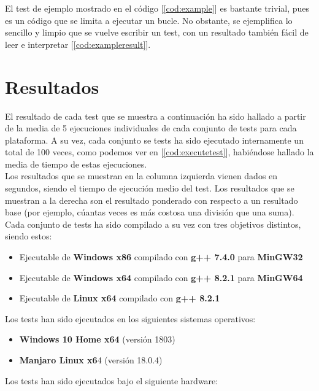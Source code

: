 El test de ejemplo mostrado en el código [\ref{cod:example}] es bastante trivial, pues es un código que se limita a ejecutar un bucle. No obstante, se ejemplifica lo sencillo y limpio que se vuelve escribir un test, con un resultado también fácil de leer e interpretar [\ref{cod:exampleresult}].

\section{Resultados}

El resultado de cada test que se muestra a continuación ha sido hallado a partir de la media de 5 ejecuciones individuales de cada conjunto de tests para cada plataforma. A su vez, cada conjunto se tests ha sido ejecutado internamente un total de 100 veces, como podemos ver en [\ref{cod:executetest}], habiéndose hallado la media de tiempo de estas ejecuciones.\\

Los resultados que se muestran en la columna izquierda vienen dados en segundos, siendo el tiempo de ejecución medio del test. Los resultados que se muestran a la derecha son el resultado ponderado con respecto a un resultado base (por ejemplo, cúantas veces es más costosa una división que una suma).\\

Cada conjunto de tests ha sido compilado a su vez con tres objetivos distintos, siendo estos:

\begin{itemize}
	\item Ejecutable de \textbf{Windows x86} compilado con \textbf{g++ 7.4.0} para \textbf{MinGW32}
	\item Ejecutable de \textbf{Windows x64} compilado con \textbf{g++ 8.2.1} para \textbf{MinGW64}
	\item Ejecutable de \textbf{Linux x64} compilado con \textbf{g++ 8.2.1}
\end{itemize}

Los tests han sido ejecutados en los siguientes sistemas operativos:

\begin{itemize}
	\item \textbf{Windows 10 Home x64} (versión 1803)
	\item \textbf{Manjaro Linux x6}4 (versión 18.0.4)
\end{itemize}

Los tests han sido ejecutados bajo el siguiente hardware:

